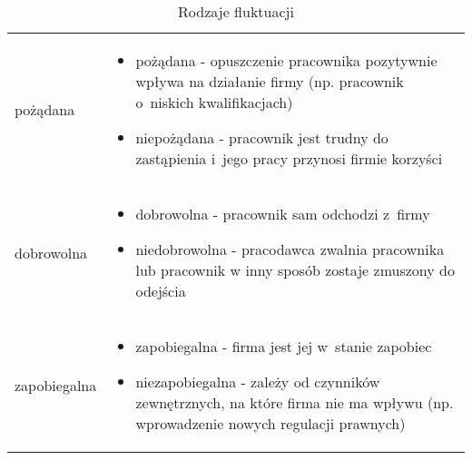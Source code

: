 \noindent\begin{minipage}{\textwidth}
             \begin{table}[H]
                 \raggedright\caption{Rodzaje fluktuacji\label{tabela:fluktuacja-rodzaje}}
                 \begin{center}
                     \begin{tabular}{|P{.15\textwidth}|P{.75\textwidth}|}

                         \hline
                          &
                          \\
                         \hline

                         pożądana &
                         \begin{itemize}
                             \item pożądana - opuszczenie pracownika pozytywnie wpływa na działanie firmy (np. pracownik o~niskich kwalifikacjach)
                             \item niepożądana - pracownik jest trudny do zastąpienia i~jego pracy przynosi firmie korzyści
                         \end{itemize} \\
                         \hline

                         dobrowolna &
                         \begin{itemize}
                             \item dobrowolna - pracownik sam odchodzi z~firmy
                             \item niedobrowolna - pracodawca zwalnia pracownika lub pracownik w inny sposób zostaje zmuszony do odejścia
                         \end{itemize} \\
                         \hline

                         zapobiegalna &
                         \begin{itemize}
                             \item zapobiegalna - firma jest jej w~stanie zapobiec
                             \item niezapobiegalna - zależy od czynników zewnętrznych, na które firma nie ma wpływu (np. wprowadzenie nowych regulacji prawnych)
                         \end{itemize} \\
                         \hline


\end{tabular}
\end{center}
\end{table}
\end{minipage}

